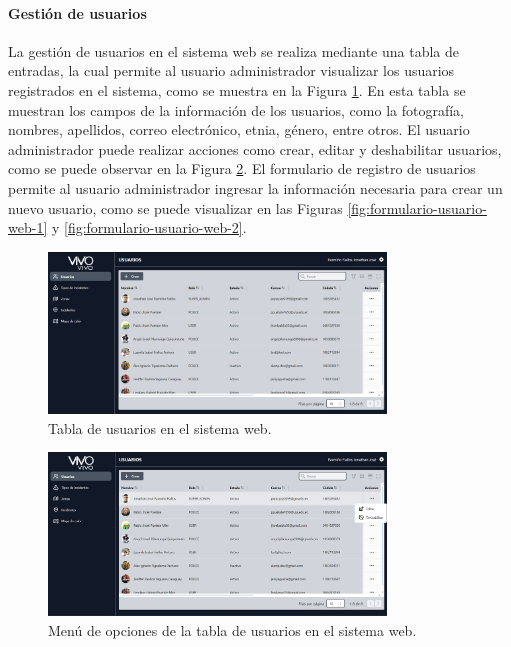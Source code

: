 \paragraph{Gestión de usuarios}
La gestión de usuarios en el sistema web se realiza mediante una tabla de entradas, la cual permite al usuario administrador
visualizar los usuarios registrados en el sistema, como se muestra en la Figura \ref{fig:tabla-usuarios-web}. En esta tabla se
muestran los campos de la información de los usuarios, como la fotografía, nombres, apellidos, correo electrónico, etnia, género,
entre otros. El usuario administrador puede realizar acciones como crear, editar y deshabilitar usuarios, como se puede observar en la Figura
\ref{fig:menu-tabla-usuarios-web}. El formulario de registro de usuarios permite al usuario administrador ingresar la información
necesaria para crear un nuevo usuario, como se puede visualizar en las Figuras \ref{fig:formulario-usuario-web-1} y \ref{fig:formulario-usuario-web-2}.

\begin{figure}[H]
    \centering
    \includegraphics[width=0.8\textwidth]{chapters/III-resultados-y-discusion/resources/images/tabla-usuarios-web.png}
    \caption{Tabla de usuarios en el sistema web.}
    \label{fig:tabla-usuarios-web}
\end{figure}

\begin{figure}[H]
    \centering
    \includegraphics[width=0.8\textwidth]{chapters/III-resultados-y-discusion/resources/images/menu-tabla-usuarios-web.png}
    \caption{Menú de opciones de la tabla de usuarios en el sistema web.}
    \label{fig:menu-tabla-usuarios-web}
\end{figure}

